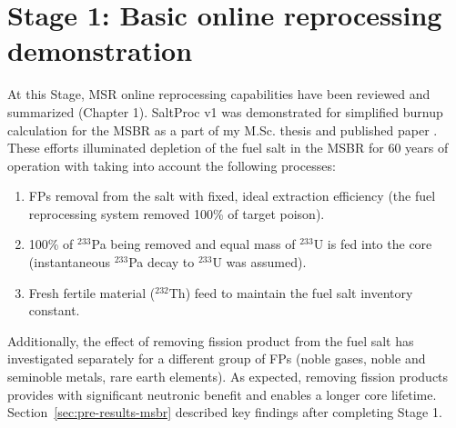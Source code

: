 \section{Stage 1: Basic online reprocessing demonstration}
At this Stage, \gls{MSR} online reprocessing capabilities have been reviewed 
and summarized (Chapter 1). SaltProc v1 was demonstrated for simplified burnup 
calculation for the \gls{MSBR} as a part of my M.Sc. thesis  
\cite{rykhlevskii_advanced_2018} and published paper  
\cite{rykhlevskii_modeling_2019}. These efforts illuminated depletion of the 
fuel salt in the \gls{MSBR} for 60 years of operation with taking into account 
the following processes:
\begin{enumerate}
	\item \glspl{FP} removal from the salt with fixed, ideal extraction 
	efficiency (the fuel reprocessing system removed 100\% of target poison).
	\item 100\% of $^{233}$Pa being removed and equal mass of $^{233}$U is fed 
	into the core (instantaneous $^{233}$Pa decay to $^{233}$U was assumed).
	\item Fresh fertile material ($^{232}$Th) feed to maintain the fuel salt 
	inventory constant.
\end{enumerate}
Additionally, the effect of removing fission product from the fuel salt has 
investigated separately for a different group of \glspl{FP} (noble gases, 
noble and seminoble metals, rare earth elements). As expected, removing  
fission products provides with significant neutronic benefit and enables a 
longer core lifetime. Section~\ref{sec:pre-results-msbr} described key 
findings after completing Stage 1.

